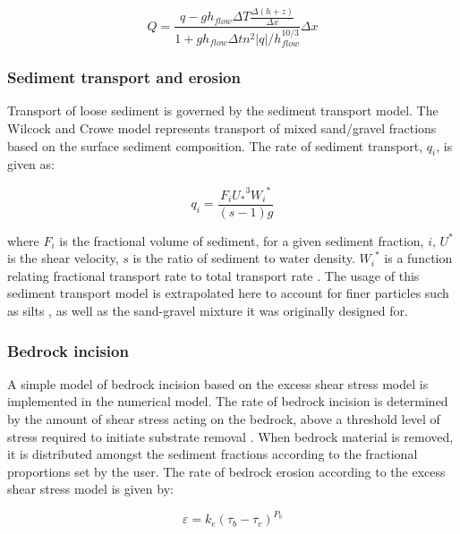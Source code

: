 \begin{equation}
Q = \frac{q - g h_{flow} \Delta T \frac{\Delta (h+z) }{\Delta x}}{1 + g h_{flow} \Delta t n^2 |q| / h_{flow}^{10/3}} \Delta x
\end{equation}

\subsubsection{Sediment transport and erosion}

Transport of loose sediment is governed by the \citet{wilcock2003surface} sediment transport model. The Wilcock and Crowe model represents transport of mixed sand/gravel fractions based on the surface sediment composition. The rate of sediment transport, \(q_i\), is given as:

\begin{equation}
q_i = \frac{F_i {U_*}^3 {W_i}^*}{(s -1) g}
\end{equation}

\noindent
where \(F_i\) is the fractional volume of sediment, for a given sediment fraction, \(i\), \(U^*\) is the shear velocity, \(s\) is the ratio of sediment to water density. \({W_i}^*\) is a function relating fractional transport rate to total transport rate \citep[see][for a full derivation of this equation]{wilcock2003surface}. The usage of this sediment transport model is extrapolated here to account for finer particles such as silts \citep{van2007embedding}, as well as the sand-gravel mixture it was originally designed for.

\subsubsection{Bedrock incision}
\label{bedrock_model}
A simple model of bedrock incision based on the excess shear stress model \citep{tucker2001child,tucker2004drainage} is implemented in the numerical model. The rate of bedrock incision is determined by the amount of shear stress acting on the bedrock, above a threshold level of stress required to initiate substrate removal \citep[e.g.,][]{Snyder2003}. When bedrock material is removed, it is distributed amongst the sediment fractions according to the fractional proportions set by the user. The rate of bedrock erosion according to the excess shear stress model is given by:

\begin{equation}
\varepsilon = k_e(\tau_b - \tau_c)^{P_b}
\end{equation}

